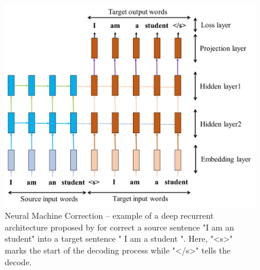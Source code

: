 \begin{figure}[ht]
    \centering
    \includegraphics[width=\textwidth]{NMC.png}
    \caption{Neural Machine Correction – example of a deep recurrent architecture proposed by for correct a source sentence "I am an student" into a target sentence " I am a student ". Here, "<s>" marks the start of the decoding process while "</s>" tells the decode.}
    \label{fig:4}
\end{figure}


